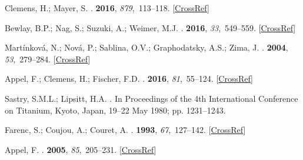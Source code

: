 \documentclass[materials,article,accept,moreauthors,pdftex,10pt,a4paper]{Definitions/mdpi}
\begin{document}
\begin{thebibliography}{999}

Clemens, H.; Mayer, S.
.
 {\bf 2016}, {\em 879},~113--118. [\href{http://dx.doi.org/10.4028/www.scientific.net/MSF.879.113}{CrossRef}]

Bewlay, B.P.; Nag, S.; Suzuki, A.; Weimer, M.J.
.
 {\bf 2016}, {\em 33},~549--559. [\href{http://dx.doi.org/10.1080/09603409.2016.1183068}{CrossRef}]

Mart{\'{i}}nkov{\'{a}}, N.; Nov{\'{a}}, P.; Sablina, O.V.; Graphodatsky, A.S.;
Zima, J.
.
 {\bf 2004}, {\em 53},~279--284. [\href{http://dx.doi.org/10.1007/s13398-014-0173-7.2}{CrossRef}]

Appel, F.; Clemens, H.; Fischer, F.D.
.
 {\bf 2016}, {\em 81},~55--124. [\href{http://dx.doi.org/10.1016/j.pmatsci.2016.01.001}{CrossRef}]

Sastry, S.M.L.; Lipsitt, H.A.
.
\newblock  In Proceedings of the 4th International Conference on Titanium,  {Kyoto, Japan,  19--22  May} 1980;
pp. 1231--1243. %

Farenc, S.; Coujou, A.; Couret, A.
.
 {\bf 1993}, {\em 67},~127--142. [\href{http://dx.doi.org/10.1080/01418619308207147}{CrossRef}]

Appel, F.
.
 {\bf 2005}, {\em 85},~205--231. [\href{http://dx.doi.org/10.1080/14786430412331315662}{CrossRef}]


\end{thebibliography}
\end{document}
